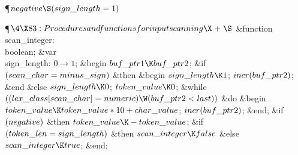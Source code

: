 \Y\P\D {}$\\{negative}\S(\\{sign\_length}=1)$%
\par
\Y\P$\4\X83:Procedures and functions for input scanning\X\mathrel{+}\S$\6
\4\&{function}\1\  \\{scan\_integer}: \\{boolean};\6
\4\&{var} \\{sign\_length}: $0\to1$;\2\6
\&{begin} $\\{buf\_ptr1}\K\\{buf\_ptr2}$;\6
\&{if} $(\\{scan\_char}=\\{minus\_sign})$ \1\&{then}\6
\&{begin} $\\{sign\_length}\K1$;\5
$\\{incr}(\\{buf\_ptr2})$;\6
\&{end}\6
\4\&{else} $\\{sign\_length}\K0$;\2\6
$\\{token\_value}\K0$;\6
\&{while} $((\\{lex\_class}[\\{scan\_char}]=\\{numeric})\W(\\{buf\_ptr2}<%
\\{last}))$ \1\&{do}\6
\&{begin} $\\{token\_value}\K\\{token\_value}\ast10+\\{char\_value}$;\5
$\\{incr}(\\{buf\_ptr2})$;\6
\&{end};\2\6
\&{if} $(\\{negative})$ \1\&{then}\5
$\\{token\_value}\K-\\{token\_value}$;\2\6
\&{if} $(\\{token\_len}=\\{sign\_length})$ \1\&{then}\6
$\\{scan\_integer}\K\\{false}$\6
\4\&{else} $\\{scan\_integer}\K\\{true}$;\2\6
\&{end};\par
\fi

